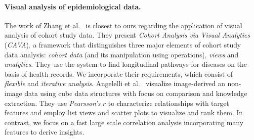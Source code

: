 \documentclass[journal]{style/vgtc} 			          %
\begin{document}
\paragraph{Visual analysis of epidemiological data.}
The work of Zhang et al.~\cite{Gotz2014, Zhang2014} is closest to ours regarding the application of visual analysis of cohort study data.
They present \emph{Cohort Analysis via Visual Analytics} (\emph{CAVA}), a framework that distinguishes three major elements of cohort study data analysis: \emph{cohort data} (and its manipulation using operations), \emph{views} and \emph{analytics}.
They use the system to find longitudinal pathways for diseases on the basis of health records.
We incorporate their requirements, which consist of \emph{flexible} and \emph{iterative analysis}. %
Angelelli et al.~\cite{Angelelli} visualize image-derived an non-image data using cube data structures with focus on comparison and knowledge extraction.
They use \emph{Pearsson's} $r$ to characterize relationships with target features and employ list views and scatter plots to visualize and rank them.
In contrast, we focus on a fast large scale correlation analysis incorporating many features to derive insights.
\end{document}
